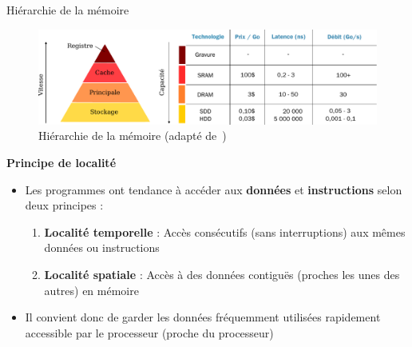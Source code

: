 \documentclass[8pt]{beamer}
\begin{document}
\begin{frame}{Hiérarchie de la mémoire}

    \begin{figure}
        \centering
        \includegraphics[width=\linewidth]{figures/hierarchy_memory.pdf}
        \caption{Hiérarchie de la mémoire (adapté de~\cite{harris2021digital})}
    \end{figure}
    \pause
    \textbf{Principe de localité}
    \begin{itemize}
        \item Les programmes ont tendance à accéder aux \textbf{données} et
              \textbf{instructions} selon deux principes :
              \begin{enumerate}
                  \item \textbf{Localité temporelle} : Acc\`es consécutifs
                        (sans interruptions) aux
                        mêmes données ou instructions
                  \item \textbf{Localité spatiale} : Acc\`es à des données
                        contiguës (proches les unes des autres) en mémoire
              \end{enumerate}
        \item Il convient donc de garder les données fréquemment utilisées
              rapidement accessible par le processeur (proche du processeur)
    \end{itemize}
\end{frame}
\end{document}
